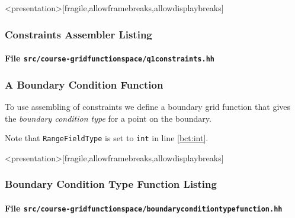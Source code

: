\begin{frame}<presentation>[fragile,allowframebreaks,allowdisplaybreaks]
\frametitle<presentation>{Constraints Assembler Listing}
\framesubtitle<presentation>{File \texttt{src/course-gridfunctionspace/q1constraints.hh}}

\end{frame}

\begin{frame}
\frametitle<presentation>{A Boundary Condition Function}
To use assembling of constraints 
we define a boundary grid function that gives the \textit{boundary
condition type} for a point on the boundary.

Note that \lstinline{RangeFieldType} is set to \lstinline{int} in
line \ref{bct:int}.
\end{frame}

\begin{frame}<presentation>[fragile,allowframebreaks,allowdisplaybreaks]
\frametitle<presentation>{Boundary Condition Type Function Listing}
\framesubtitle<presentation>{File \texttt{src/course-gridfunctionspace/boundaryconditiontypefunction.hh}}

\end{frame}

